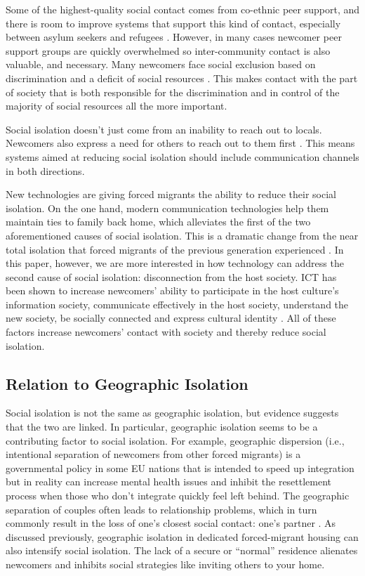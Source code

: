 Some of the highest-quality social contact comes from co-ethnic peer support, and there is room to improve systems that support this kind of contact, especially between asylum seekers and refugees \cite{almohamed_vulnerability_2016}. However, in many cases newcomer peer support groups are quickly overwhelmed so inter-community contact is also valuable, and necessary. Many newcomers face social exclusion based on discrimination and a deficit of social resources \cite{hynie_immigrant_2011}. This makes contact with the part of society that is both responsible for the discrimination and in control of the majority of social resources all the more important.

Social isolation doesn't just come from an inability to reach out to locals. Newcomers also express a need for others to reach out to them first \cite[p.~166]{almohamed_designing_2016}. This means systems aimed at reducing social isolation should include communication channels in both directions.

New technologies are giving forced migrants the ability to reduce their social isolation. On the one hand, modern communication technologies help them maintain ties to family back home, which alleviates the first of the two aforementioned causes of social isolation. This is a dramatic change from the near total isolation that forced migrants of the previous generation experienced \cite[p.~553]{harney_precarity_2013}. In this paper, however, we are more interested in how technology can address the second cause of social isolation: disconnection from the host society. ICT has been shown to increase newcomers' ability to participate in the host culture's information society, communicate effectively in the host society, understand the new society, be socially connected and express cultural identity \cite{diaz_andrade_information_2016}. All of these factors increase newcomers' contact with society and thereby reduce social isolation.


\subsection*{Relation to Geographic Isolation}

Social isolation is not the same as geographic isolation, but evidence suggests that the two are linked. In particular, geographic isolation seems to be a contributing factor to social isolation. For example, geographic dispersion (i.e., intentional separation of newcomers from other forced migrants) is a governmental policy in some EU nations that is intended to speed up integration but in reality can increase mental health issues and inhibit the resettlement process when those who don't integrate quickly feel left behind. The geographic separation of couples often leads to relationship problems, which in turn commonly result in the loss of one's closest social contact: one's partner \cite[p.~939]{carballo_migration_1998}. As discussed previously, geographic isolation in dedicated forced-migrant housing can also intensify social isolation. The lack of a secure or ``normal'' residence alienates newcomers and inhibits social strategies like inviting others to your home.

